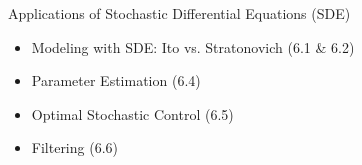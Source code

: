 \documentclass{beamer}
\begin{document}
    \centering
{}


\newline\newline\newline
\newline
\newline
    Applications of Stochastic Differential Equations (SDE)
\begin{itemize}
  \item Modeling with SDE: Ito vs. Stratonovich (6.1 \& 6.2)
  \item Parameter Estimation (6.4)
  \item Optimal Stochastic Control (6.5)
  \item Filtering (6.6)
  \end{itemize}
  
\pagestyle{plain}
\end{document}
